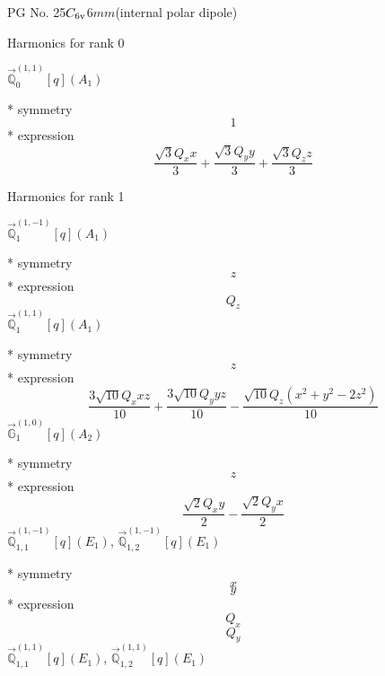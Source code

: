 \documentclass[fleqn,8pt]{jsarticle}
\begin{document}
\setcounter{MaxMatrixCols}{32}

\renewcommand{\tablename}{Table~}
\renewcommand{\figurename}{Figure~}
\begin{center}
\LARGE
PG No. 25\quad$C_{\rm 6v}$\quad$6mm$\quad[ hexagonal ] (internal polar dipole)
\end{center}

\noindent * Harmonics for rank 0

\noindent\quad $\vec{\mathbb{Q}}_{0}^{(1,1)}[q](A_{1})$

\noindent\quad ** symmetry
\begin{dmath*}
1
\end{dmath*}
\noindent\quad ** expression
\begin{dmath*}
\frac{\sqrt{3} Q_{x} x}{3} + \frac{\sqrt{3} Q_{y} y}{3} + \frac{\sqrt{3} Q_{z} z}{3}
\end{dmath*}

\noindent * Harmonics for rank 1

\noindent\quad $\vec{\mathbb{Q}}_{1}^{(1,-1)}[q](A_{1})$

\noindent\quad ** symmetry
\begin{dmath*}
z
\end{dmath*}
\noindent\quad ** expression
\begin{dmath*}
Q_{z}
\end{dmath*}
\noindent\quad $\vec{\mathbb{Q}}_{1}^{(1,1)}[q](A_{1})$

\noindent\quad ** symmetry
\begin{dmath*}
z
\end{dmath*}
\noindent\quad ** expression
\begin{dmath*}
\frac{3 \sqrt{10} Q_{x} x z}{10} + \frac{3 \sqrt{10} Q_{y} y z}{10} - \frac{\sqrt{10} Q_{z} \left(x^{2} + y^{2} - 2 z^{2}\right)}{10}
\end{dmath*}
\noindent\quad $\vec{\mathbb{G}}_{1}^{(1,0)}[q](A_{2})$

\noindent\quad ** symmetry
\begin{dmath*}
z
\end{dmath*}
\noindent\quad ** expression
\begin{dmath*}
\frac{\sqrt{2} Q_{x} y}{2} - \frac{\sqrt{2} Q_{y} x}{2}
\end{dmath*}
\noindent\quad $\vec{\mathbb{Q}}_{1,1}^{(1,-1)}[q](E_{1})$, $\vec{\mathbb{Q}}_{1,2}^{(1,-1)}[q](E_{1})$

\noindent\quad ** symmetry
\begin{dmath*}
x
\end{dmath*}
\begin{dmath*}
y
\end{dmath*}
\noindent\quad ** expression
\begin{dmath*}
Q_{x}
\end{dmath*}
\begin{dmath*}
Q_{y}
\end{dmath*}
\noindent\quad $\vec{\mathbb{Q}}_{1,1}^{(1,1)}[q](E_{1})$, $\vec{\mathbb{Q}}_{1,2}^{(1,1)}[q](E_{1})$
\end{document}
